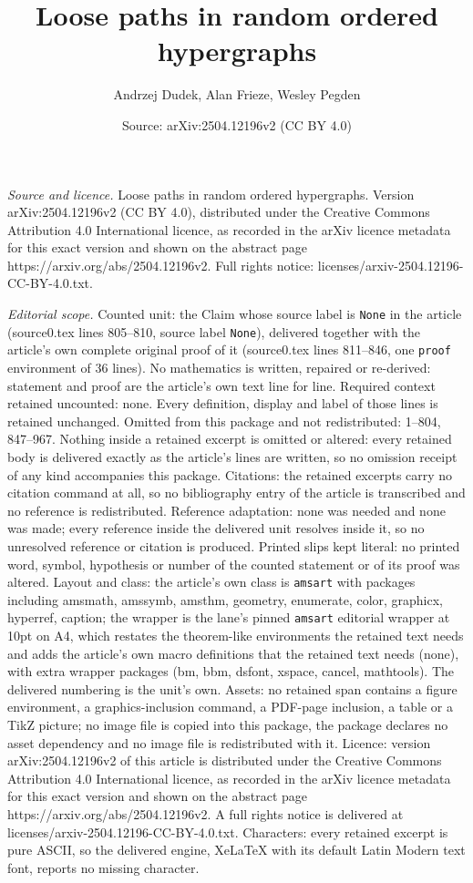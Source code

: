 \documentclass[10pt,a4paper]{amsart}
\title[Loose paths in random ordered hypergraphs]{Loose paths in random ordered hypergraphs}
\author{Andrzej Dudek, Alan Frieze, Wesley Pegden}
\date{Source: arXiv:2504.12196v2 (CC BY 4.0)}
\begin{document}
\maketitle

\noindent\emph{Source and licence.} Loose paths in random ordered hypergraphs. Version arXiv:2504.12196v2 (CC BY 4.0), distributed under the Creative Commons Attribution 4.0 International licence, as recorded in the arXiv licence metadata for this exact version and shown on the abstract page https://arxiv.org/abs/2504.12196v2. Full rights notice: licenses/arxiv-2504.12196-CC-BY-4.0.txt.\par\smallskip

\noindent\textit{Editorial scope.} Counted unit: the Claim whose source label is \texttt{None} in the article (source0.tex lines 805--810, source label \texttt{None}), delivered together with the article's own complete original proof of it (source0.tex lines 811--846, one \texttt{proof} environment of 36 lines). No mathematics is written, repaired or re-derived: statement and proof are the article's own text line for line. Required context retained uncounted: none. Every definition, display and label of those lines is retained unchanged. Omitted from this package and not redistributed: 1--804, 847--967. Nothing inside a retained excerpt is omitted or altered: every retained body is delivered exactly as the article's lines are written, so no omission receipt of any kind accompanies this package. Citations: the retained excerpts carry no citation command at all, so no bibliography entry of the article is transcribed and no reference is redistributed. Reference adaptation: none was needed and none was made; every reference inside the delivered unit resolves inside it, so no unresolved reference or citation is produced. Printed slips kept literal: no printed word, symbol, hypothesis or number of the counted statement or of its proof was altered. Layout and class: the article's own class is \texttt{amsart} with packages including amsmath, amssymb, amsthm, geometry, enumerate, color, graphicx, hyperref, caption; the wrapper is the lane's pinned \texttt{amsart} editorial wrapper at 10pt on A4, which restates the theorem-like environments the retained text needs and adds the article's own macro definitions that the retained text needs (none), with extra wrapper packages (bm, bbm, dsfont, xspace, cancel, mathtools). The delivered numbering is the unit's own. Assets: no retained span contains a figure environment, a graphics-inclusion command, a PDF-page inclusion, a table or a TikZ picture; no image file is copied into this package, the package declares no asset dependency and no image file is redistributed with it. Licence: version arXiv:2504.12196v2 of this article is distributed under the Creative Commons Attribution 4.0 International licence, as recorded in the arXiv licence metadata for this exact version and shown on the abstract page https://arxiv.org/abs/2504.12196v2. A full rights notice is delivered at licenses/arxiv-2504.12196-CC-BY-4.0.txt. Characters: every retained excerpt is pure ASCII, so the delivered engine, XeLaTeX with its default Latin Modern text font, reports no missing character.
\end{document}
